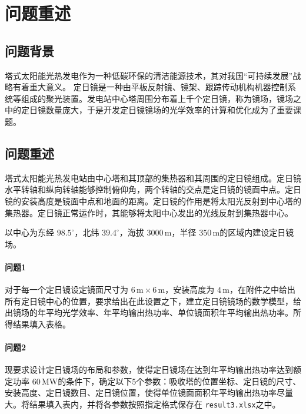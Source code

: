 \section{问题重述}
\subsection{问题背景}
塔式太阳能光热发电作为一种低碳环保的清洁能源技术，其对我国``可持续发展''战略有着重大意义。
定日镜是一种由平板反射镜、镜架、跟踪传动机构机器控制系统等组成的聚光装置。发电站中心塔周围分布着上千个定日镜，称为镜场，镜场之中的定日镜数量庞大，于是开发定日镜镜场的光学效率的计算和优化成为了重要课题。
\subsection{问题重述}
塔式太阳能光热发电站由中心塔和其顶部的集热器和其周围的定日镜组成。定日镜水平转轴和纵向转轴能够控制俯仰角，两个转轴的交点是定日镜的镜面中点。定日镜的安装高度是镜面中点和地面的距离。定日镜的作用是将太阳光反射到中心塔的集热器。定日镜正常运作时，其能够将太阳中心发出的光线反射到集热器中心。

以中心为东经 \(98.5^\circ\)，北纬 \(39.4 ^\circ\)，海拔 \(3000\, \mathrm{m}\)，半径 \(350 \, \mathrm{m}\)的区域内建设定日镜场。
\paragraph{问题1}
对于每一个定日镜设定镜面尺寸为 \(6 \,\mathrm{m} \times 6 \, \mathrm{m}\)，安装高度为 \(4 \,\mathrm{m}\)，在附件之中给出所有定日镜中心的位置，要求给出在此设置之下，建立定日镜镜场的数学模型，给出镜场的年平均光学效率、年平均输出热功率、单位镜面积年平均输出热功率。所得结果填入表格。
\paragraph{问题2}
现要求设计定日镜场的布局和参数，使得定日镜场在达到年平均输出热功率达到额定功率 \(60 \, \mathrm{MW}\)的条件下，确定以下5个参数：吸收塔的位置坐标、定日镜的尺寸、安装高度、定日镜数目、定日镜位置，使得单位镜面面积年平均输出热功率尽量大。将结果填入表内，并将各参数按照指定格式保存在 \texttt{result3.xlsx}之中。
